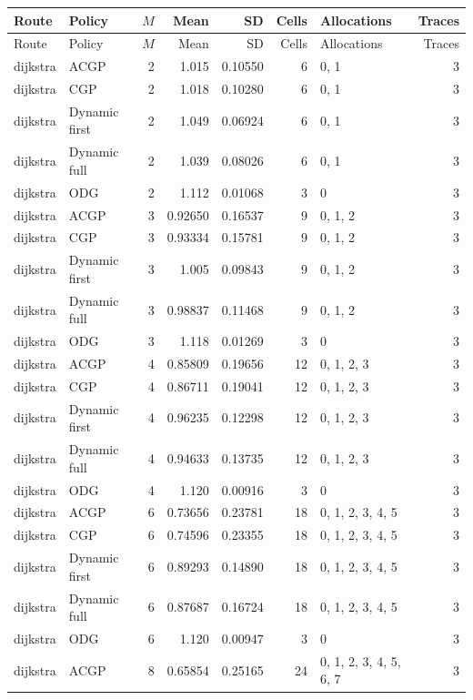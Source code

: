 \documentclass[10pt,a4paper]{article}
\begin{document}
\tiny\setlength{\tabcolsep}{2pt}\begin{longtable}{@{}p{23mm}p{29mm}rrrrp{36mm}r@{}}
\toprule Route & Policy & $M$ & Mean & SD & Cells & Allocations & Traces \\ \midrule\endfirsthead
\toprule Route & Policy & $M$ & Mean & SD & Cells & Allocations & Traces \\ \midrule\endhead
\bottomrule\endfoot
dijkstra & ACGP & 2 & 1.015 & 0.10550 & 6 & 0, 1 & 3 \\
dijkstra & CGP & 2 & 1.018 & 0.10280 & 6 & 0, 1 & 3 \\
dijkstra & Dynamic first & 2 & 1.049 & 0.06924 & 6 & 0, 1 & 3 \\
dijkstra & Dynamic full & 2 & 1.039 & 0.08026 & 6 & 0, 1 & 3 \\
dijkstra & ODG & 2 & 1.112 & 0.01068 & 3 & 0 & 3 \\
dijkstra & ACGP & 3 & 0.92650 & 0.16537 & 9 & 0, 1, 2 & 3 \\
dijkstra & CGP & 3 & 0.93334 & 0.15781 & 9 & 0, 1, 2 & 3 \\
dijkstra & Dynamic first & 3 & 1.005 & 0.09843 & 9 & 0, 1, 2 & 3 \\
dijkstra & Dynamic full & 3 & 0.98837 & 0.11468 & 9 & 0, 1, 2 & 3 \\
dijkstra & ODG & 3 & 1.118 & 0.01269 & 3 & 0 & 3 \\
dijkstra & ACGP & 4 & 0.85809 & 0.19656 & 12 & 0, 1, 2, 3 & 3 \\
dijkstra & CGP & 4 & 0.86711 & 0.19041 & 12 & 0, 1, 2, 3 & 3 \\
dijkstra & Dynamic first & 4 & 0.96235 & 0.12298 & 12 & 0, 1, 2, 3 & 3 \\
dijkstra & Dynamic full & 4 & 0.94633 & 0.13735 & 12 & 0, 1, 2, 3 & 3 \\
dijkstra & ODG & 4 & 1.120 & 0.00916 & 3 & 0 & 3 \\
dijkstra & ACGP & 6 & 0.73656 & 0.23781 & 18 & 0, 1, 2, 3, 4, 5 & 3 \\
dijkstra & CGP & 6 & 0.74596 & 0.23355 & 18 & 0, 1, 2, 3, 4, 5 & 3 \\
dijkstra & Dynamic first & 6 & 0.89293 & 0.14890 & 18 & 0, 1, 2, 3, 4, 5 & 3 \\
dijkstra & Dynamic full & 6 & 0.87687 & 0.16724 & 18 & 0, 1, 2, 3, 4, 5 & 3 \\
dijkstra & ODG & 6 & 1.120 & 0.00947 & 3 & 0 & 3 \\
dijkstra & ACGP & 8 & 0.65854 & 0.25165 & 24 & 0, 1, 2, 3, 4, 5, 6, 7 & 3 \\

\end{longtable}
\end{document}
